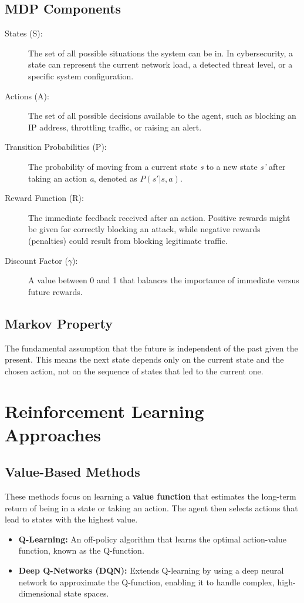 \documentclass[16pt]{report}
\begin{document}
\subsection{MDP Components}
\begin{description}
    \item[States (S):] The set of all possible situations the system can be in. In cybersecurity, a state can represent the current network load, a detected threat level, or a specific system configuration.
    \item[Actions (A):] The set of all possible decisions available to the agent, such as blocking an IP address, throttling traffic, or raising an alert.
    \item[Transition Probabilities (P):] The probability of moving from a current state \textit{s} to a new state \textit{s'} after taking an action \textit{a}, denoted as \(P(s'|s,a)\).
    \item[Reward Function (R):] The immediate feedback received after an action. Positive rewards might be given for correctly blocking an attack, while negative rewards (penalties) could result from blocking legitimate traffic.
    \item[Discount Factor (\(\gamma\)):] A value between 0 and 1 that balances the importance of immediate versus future rewards.
\end{description}

\subsection{Markov Property}
The fundamental assumption that the future is independent of the past given the present. This means the next state depends only on the current state and the chosen action, not on the sequence of states that led to the current one.

\section{Reinforcement Learning Approaches}

\subsection{Value-Based Methods}
These methods focus on learning a \textbf{value function} that estimates the long-term return of being in a state or taking an action. The agent then selects actions that lead to states with the highest value.
\begin{itemize}
    \item \textbf{Q-Learning:} An off-policy algorithm that learns the optimal action-value function, known as the Q-function.
    \item \textbf{Deep Q-Networks (DQN):} Extends Q-learning by using a deep neural network to approximate the Q-function, enabling it to handle complex, high-dimensional state spaces.
\end{itemize}
\end{document}
